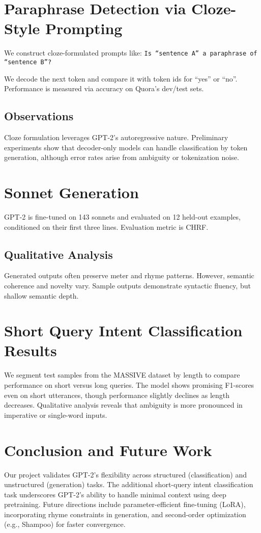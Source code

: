 \documentclass{article}
\begin{document}
\section{Paraphrase Detection via Cloze-Style Prompting}
We construct cloze-formulated prompts like:
\texttt{Is ``sentence A'' a paraphrase of ``sentence B''?}

We decode the next token and compare it with token ids for ``yes'' or ``no''. Performance is measured via accuracy on Quora's dev/test sets.

\subsection{Observations}
Cloze formulation leverages GPT-2's autoregressive nature. Preliminary experiments show that decoder-only models can handle classification by token generation, although error rates arise from ambiguity or tokenization noise.

\section{Sonnet Generation}
GPT-2 is fine-tuned on 143 sonnets and evaluated on 12 held-out examples, conditioned on their first three lines. Evaluation metric is CHRF.

\subsection{Qualitative Analysis}
Generated outputs often preserve meter and rhyme patterns. However, semantic coherence and novelty vary. Sample outputs demonstrate syntactic fluency, but shallow semantic depth.

\section{Short Query Intent Classification Results}
We segment test samples from the MASSIVE dataset by length to compare performance on short versus long queries. The model shows promising F1-scores even on short utterances, though performance slightly declines as length decreases. Qualitative analysis reveals that ambiguity is more pronounced in imperative or single-word inputs.

\section{Conclusion and Future Work}
Our project validates GPT-2's flexibility across structured (classification) and unstructured (generation) tasks. The additional short-query intent classification task underscores GPT-2's ability to handle minimal context using deep pretraining. Future directions include parameter-efficient fine-tuning (LoRA), incorporating rhyme constraints in generation, and second-order optimization (e.g., Shampoo) for faster convergence.
\end{document}
